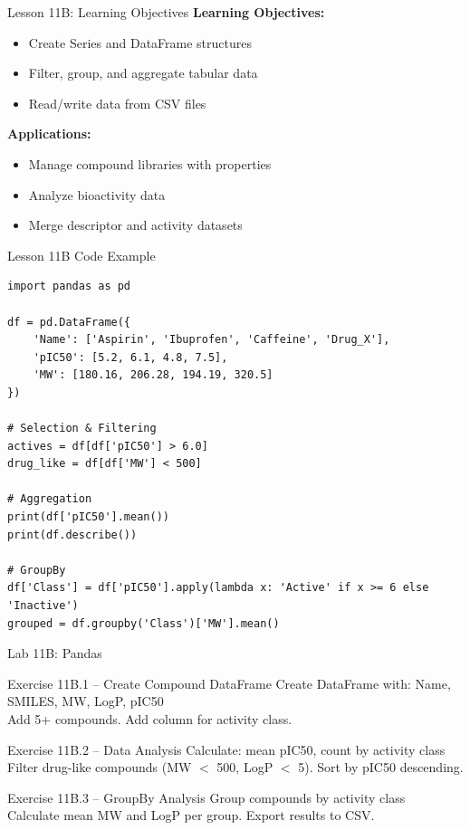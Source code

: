 \documentclass{beamer}
\begin{document}
\begin{frame}{Lesson 11B: Learning Objectives}
    \small
    \textbf{Learning Objectives:}
    \begin{itemize}
        \item Create Series and DataFrame structures
        \item Filter, group, and aggregate tabular data
        \item Read/write data from CSV files
    \end{itemize}
    \vspace{0.5em}
    \textbf{Applications:}
    \begin{itemize}
        \item Manage compound libraries with properties
        \item Analyze bioactivity data
        \item Merge descriptor and activity datasets
    \end{itemize}
\end{frame}

\begin{frame}[fragile]{Lesson 11B Code Example}
    \small
    \begin{lstlisting}[style=codeStyle]
import pandas as pd

df = pd.DataFrame({
    'Name': ['Aspirin', 'Ibuprofen', 'Caffeine', 'Drug_X'],
    'pIC50': [5.2, 6.1, 4.8, 7.5],
    'MW': [180.16, 206.28, 194.19, 320.5]
})

# Selection & Filtering
actives = df[df['pIC50'] > 6.0]
drug_like = df[df['MW'] < 500]

# Aggregation
print(df['pIC50'].mean())
print(df.describe())

# GroupBy
df['Class'] = df['pIC50'].apply(lambda x: 'Active' if x >= 6 else 'Inactive')
grouped = df.groupby('Class')['MW'].mean()
    \end{lstlisting}
\end{frame}

\begin{frame}{\textcolor{labcolor}{Lab 11B: Pandas}}
    \footnotesize
    \begin{block}{Exercise 11B.1 -- Create Compound DataFrame}
        Create DataFrame with: Name, SMILES, MW, LogP, pIC50\\
        Add 5+ compounds. Add column for activity class.
    \end{block}
    \vspace{0.2em}
    \begin{block}{Exercise 11B.2 -- Data Analysis}
        Calculate: mean pIC50, count by activity class\\
        Filter drug-like compounds (MW $<$ 500, LogP $<$ 5). Sort by pIC50 descending.
    \end{block}
    \vspace{0.2em}
    \begin{block}{Exercise 11B.3 -- GroupBy Analysis}
        Group compounds by activity class\\
        Calculate mean MW and LogP per group. Export results to CSV.
    \end{block}
\end{frame}
\end{document}
